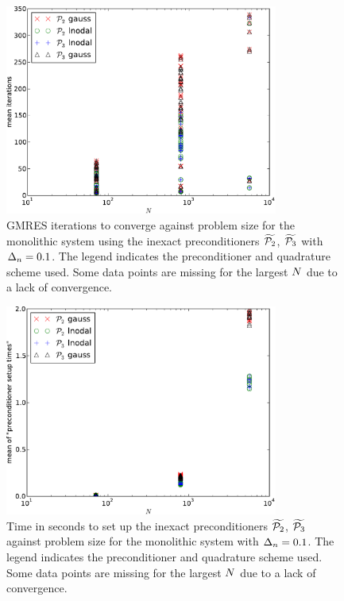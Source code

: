 \begin{figure}
  \centering
  \includegraphics[width=0.8\textwidth]{plots/linear_solvers_p2p3/implicitilu-1-meanofnsolveritersvsinitialnnode.pdf}
  \caption{GMRES iterations to converge against problem size for the monolithic system using the inexact preconditioners $\widetilde{\mathcal{P}_2}$, $\widetilde{\mathcal{P}_3}$ with $\Delta_{n}=0.1$.
    The legend indicates the preconditioner and quadrature scheme used.
    Some data points are missing for the largest $N$ due to a lack of convergence.
  }
  \label{fig:its-p23-ilu1}
\end{figure}

\begin{figure}
  \centering
  \includegraphics[width=0.8\textwidth]{plots/linear_solvers_p2p3/implicitilu-1-meanofpreconditionersetuptimesvsinitialnnode.pdf}
  \caption{
    Time in seconds to set up the inexact preconditioners $\widetilde{\mathcal{P}_2}$, $\widetilde{\mathcal{P}_3}$ against problem size for the monolithic system with $\Delta_{n}=0.1$.
    The legend indicates the preconditioner and quadrature scheme used.
    Some data points are missing for the largest $N$ due to a lack of convergence.
  }
  \label{fig:times-p23-ilu1}
\end{figure}

